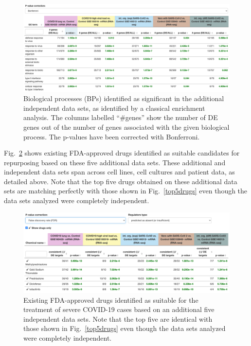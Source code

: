 \documentclass[Minh_PhD_thesis.tex]{subfiles}
\begin{document}
\begin{figure}
\centering
	\includegraphics[width=1\linewidth]{../Figures/BPs_in_common_(Bonferroni)_in_additional_datasets.png}
    \caption{Biological processes (BPs) identified as significant in the additional independent data sets, as identified by a classical enrichment analysis. The  columns labelled ``\#genes'' show the number of DE genes out of the number of genes associated with the given biological process. The p-values have been corrected with Bonferroni. }
        \label{Supp:BPs_validation} 
\end{figure}

Fig.~\ref{Supp:drugs_validation} shows existing FDA-approved drugs identified as suitable candidates for repurposing based on these five additional data sets. These additional and independent data sets span across cell lines, cell cultures and patient data, as detailed above. Note that the top five drugs obtained on these additional data sets are matching perfectly with those shown in Fig.~\ref{top5drugs} even though the data sets analyzed were completely independent.

\begin{figure}
\centering
	\includegraphics[width=1\linewidth]{../Figures/drugs_in_common_(Bonf)_validation.png}
    \caption{Existing FDA-approved drugs identified as suitable for the treatment of severe COVID-19 cases based on an additional five independent data sets. Note that the top five are identical with those shown in Fig.~\ref{top5drugs} even though the data sets analyzed were completely independent.}
        \label{Supp:drugs_validation}
\end{figure}
\end{document}
